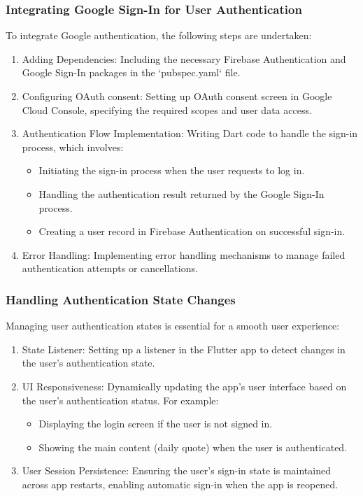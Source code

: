 \documentclass{book}
\begin{document}
\subsubsection{Integrating Google Sign-In for User Authentication}
To integrate Google authentication, the following steps are undertaken:
\begin{enumerate}
    \item Adding Dependencies: Including the necessary Firebase Authentication and Google Sign-In packages in the `pubspec.yaml` file.
    \item Configuring OAuth consent: Setting up OAuth consent screen in Google Cloud Console, specifying the required scopes and user data access.
    \item Authentication Flow Implementation: Writing Dart code to handle the sign-in process, which involves:
    \begin{itemize}
        \item Initiating the sign-in process when the user requests to log in.
        \item Handling the authentication result returned by the Google Sign-In process.
        \item Creating a user record in Firebase Authentication on successful sign-in.
    \end{itemize}
    \item Error Handling: Implementing error handling mechanisms to manage failed authentication attempts or cancellations.
\end{enumerate}

\subsubsection{Handling Authentication State Changes}
Managing user authentication states is essential for a smooth user experience:
\begin{enumerate}
    \item State Listener: Setting up a listener in the Flutter app to detect changes in the user's authentication state.
    \item UI Responsiveness: Dynamically updating the app's user interface based on the user's authentication status. For example:
    \begin{itemize}
        \item Displaying the login screen if the user is not signed in.
        \item Showing the main content (daily quote) when the user is authenticated.
    \end{itemize}
    \item User Session Persistence: Ensuring the user's sign-in state is maintained across app restarts, enabling automatic sign-in when the app is reopened.
\end{enumerate}
\end{document}
